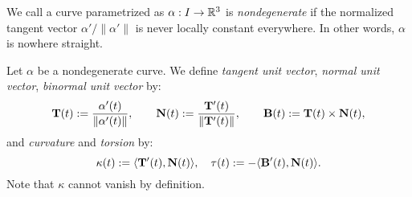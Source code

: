 \documentclass{../exp}
\def\a{\alpha}
\begin{document}
\begin{defn}
We call a curve parametrized as $\a:I\to\R^3$ is \emph{nondegenerate} if the normalized tangent vector $\a'/\|\a'\|$ is never locally constant everywhere.
In other words, $\a$ is nowhere straight.
\end{defn}

\begin{defn}
Let $\a$ be a nondegenerate curve.
We define \emph{tangent unit vector}, \emph{normal unit vector}, \emph{binormal unit vector} by:
\[\bT(t):=\frac{\a'(t)}{\norm{\a'(t)}},\qquad\bN(t):=\frac{\bT'(t)}{\|\bT'(t)\|},\qquad\bB(t):=\bT(t)\times\bN(t),\]
and \emph{curvature} and \emph{torsion} by:
\[\kappa(t):=\langle\mathbf{T}'(t),\mathbf{N}(t)\rangle,\quad\tau(t):=-\langle\mathbf{B}'(t),\mathbf{N}(t)\rangle.\]
Note that $\kappa$ cannot vanish by definition.
\end{defn}
\end{document}
